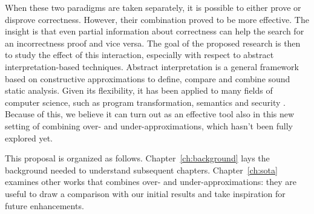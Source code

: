 When these two paradigms are taken separately, it is possible to either prove or disprove correctness. However, their combination proved to be more effective. The insight is that even partial information about correctness can help the search for an incorrectness proof and vice versa. The goal of the proposed research is then to study the effect of this interaction, especially with respect to abstract interpretation-based techniques.
Abstract interpretation \cite{CC77,RY20} is a general framework based on constructive approximations to define, compare and combine sound static analysis. Given its flexibility, it has been applied to many fields of computer science, such as program transformation, semantics and security \cite{CC14}. Because of this, we believe it can turn out as an effective tool also in this new setting of combining over- and under-approximations, which hasn't been fully explored yet.

This proposal is organized as follows. Chapter~\ref{ch:background} lays the background needed to understand subsequent chapters. Chapter~\ref{ch:sota} examines other works that combines over- and under-approximations: they are useful to draw a comparison with our initial results and take inspiration for future enhancements.
